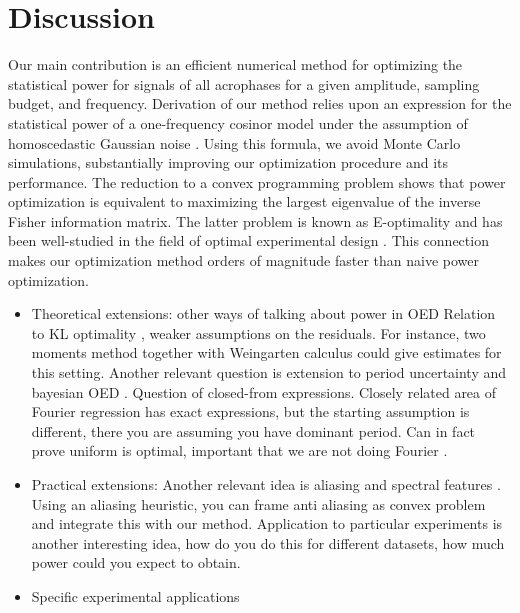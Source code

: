 \documentclass{article}
\begin{document}
\section{Discussion}
Our main contribution is an efficient numerical method for optimizing the statistical power for signals of all acrophases  for a given amplitude, sampling budget, and frequency. Derivation of our method relies upon an expression for the statistical power of a one-frequency cosinor model under the assumption of homoscedastic Gaussian noise \cite{wei2023circpower}. Using this formula, we avoid Monte Carlo simulations, substantially improving our optimization procedure and its performance.  The reduction to a convex programming problem shows that power optimization is equivalent to maximizing the largest eigenvalue of the inverse Fisher information matrix. The latter problem is known as E-optimality and has been well-studied in the field of optimal experimental design \cite{pukelsheim1993,oed2,oed3}. This connection makes our  optimization method orders of magnitude faster than naive power optimization. 
\begin{itemize}
    \item Theoretical extensions: other ways of talking about power in OED Relation to KL optimality \cite{KLpaper}, weaker assumptions on the residuals. For instance, two moments method \cite{wasserman2022} together with Weingarten calculus could give estimates for this setting. Another relevant question is extension to period uncertainty and bayesian OED \cite{bayesian}. Question of closed-from expressions. Closely related area of Fourier regression \cite{dette1,dette2} has exact expressions, but the starting assumption is different, there you are assuming you have dominant period. Can in fact prove uniform is optimal, important that we are not doing Fourier \cite{fourierEoptimality}. 
    \item Practical extensions: Another relevant idea is aliasing and spectral features \cite{stoica2009}. Using an aliasing heuristic, you can frame anti aliasing as convex problem and integrate this with our method. Application to particular experiments is another interesting idea, how do you do this for different datasets, how much power could you expect to obtain. 
    \item Specific experimental applications
\end{itemize}
\end{document}
